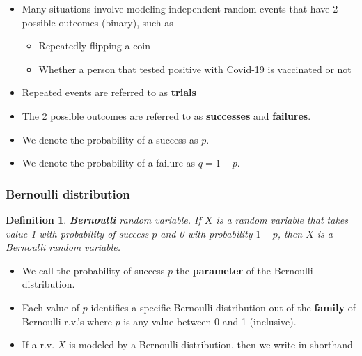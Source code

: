 \documentclass[12pt]{amsart}
\newtheorem{definition}[theorem]{Definition}
\begin{document}
{\begin{itemize}
\item Many situations involve modeling independent random events that have 2 possible outcomes (binary), such as
	\begin{itemize}
	\item Repeatedly flipping a coin
	\item Whether a person that tested positive with Covid-19 is vaccinated or not
	\end{itemize}
\item Repeated events are referred to as \textbf{trials}
\item The 2 possible outcomes are referred to as \textbf{successes} and \textbf{failures}.
\item We denote the probability of a success as $p$. 
\item We denote the probability of a failure as $q = 1-p$. 
\end{itemize}


\subsubsection{Bernoulli distribution}


\vspace{.5cm}

\begin{definition}{\textbf{Bernoulli} random variable.} \newline
If $X$ is a random variable that takes value 1 with probability of success $p$ and 0 with probability $1-p$, then $X$ is a Bernoulli random variable. 
\end{definition}
\vspace{1cm}

\begin{itemize}
\item We call the probability of success $p$ the \textbf{parameter} of the Bernoulli distribution. 
\item Each value of $p$ identifies a specific Bernoulli distribution out of the \textbf{family} of Bernoulli r.v.'s where $p$ is any value between 0 and 1 (inclusive). 
\item If a r.v. $X$ is modeled by a Bernoulli distribution, then we write in shorthand


\end{itemize}}
\end{document}
